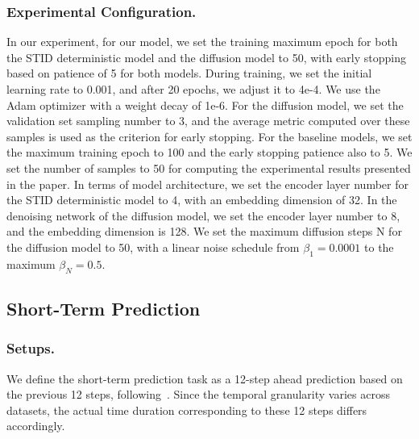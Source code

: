 \subsubsection*{\textbf{Experimental Configuration.}} 

In our experiment, for our model, we set the training maximum epoch for both the STID deterministic model and the diffusion model to 50, with early stopping based on patience of 5 for both models. During training, we set the initial learning rate to 0.001, and after 20 epochs, we adjust it to 4e-4. We use the Adam optimizer with a weight decay of 1e-6. For the diffusion model, we set the validation set sampling number to 3, and the average metric computed over these samples is used as the criterion for early stopping. For the baseline models,  we set the maximum training epoch to 100 and the early stopping patience also to 5. We set the number of samples to 50 for computing the experimental results presented in the paper. In terms of model architecture, we set the encoder layer number for the STID deterministic model to 4, with an embedding dimension of 32. In the denoising network of the diffusion model, we set the encoder layer number to 8, and the embedding dimension is 128. We set the maximum diffusion steps N for the diffusion model to 50, with a linear noise schedule from $\beta_1= 0.0001$ to the maximum $\beta_N= 0.5$.



\subsection{Short-Term Prediction}
\subsubsection*{\textbf{Setups.}} We define the short-term prediction task as a 12-step ahead prediction based on the previous 12 steps, following~\cite{sheng2025unveiling,wen2023diffstg}. Since the temporal granularity varies across datasets, the actual time duration corresponding to these 12 steps differs accordingly.

